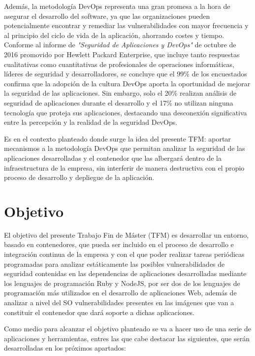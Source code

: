 Además, la metodología \gls{DevOps} representa una gran promesa a la hora de asegurar el desarrollo del software, ya que las organizaciones pueden potencialmente encontrar y remediar las vulnerabilidades con mayor frecuencia y al principio del ciclo de vida de la aplicación, ahorrando costes y tiempo. Conforme al informe de  \textit{"Seguridad de Aplicaciones y DevOps"} de octubre de 2016 promovido por Hewlett Packard Enterprise\cite{hpe2016}, que incluye tanto respuestas cualitativas como cuantitativas de profesionales de operaciones informáticas, líderes de seguridad y desarrolladores, se concluye que el 99\% de los encuestados confirma que la adopción de la cultura \gls{DevOps} aporta la oportunidad de mejorar la seguridad de las aplicaciones. Sin embargo, solo el 20\% realizan análisis de seguridad de aplicaciones durante el desarrollo y el 17\% no utilizan ninguna tecnología que proteja sus aplicaciones, destacando una desconexión significativa entre la percepción y la realidad de la seguridad \gls{DevOps}.

Es en el contexto planteado donde surge la idea del presente \gls{TFM}: aportar mecanismos a la metodología \gls{DevOps} que permitan analizar la seguridad de las aplicaciones desarrolladas y el contenedor que las albergará dentro de la infraestructura de la empresa, sin interferir de manera destructiva con el propio proceso de desarrollo y depliegue de la aplicación.

\section{Objetivo}

El objetivo del presente Trabajo Fin de Máster (\gls{TFM}) es desarrollar un entorno, basado en contenedores, que pueda ser incluido en el proceso de desarrollo e integración continua de la empresa y con el que poder realizar tareas periódicas programadas para analizar estáticamente las posibles vulnerabilidades de seguridad contenidas en las dependencias de aplicaciones desarrolladas mediante los lenguajes de programación Ruby y NodeJS, por ser dos de los lenguajes de programación más utilizados en el desarrollo de aplicaciones Web, además de analizar a nivel del \gls{SO} vulnerabilidades presentes en las imágenes que van a constituir el contenedor que dará soporte a dichas aplicaciones.

Como medio para alcanzar el objetivo planteado se va a hacer uso de una serie de aplicaciones y herramientas, entres las que cabe destacar las siguientes, que serán desarrolladas en los próximos apartados:

